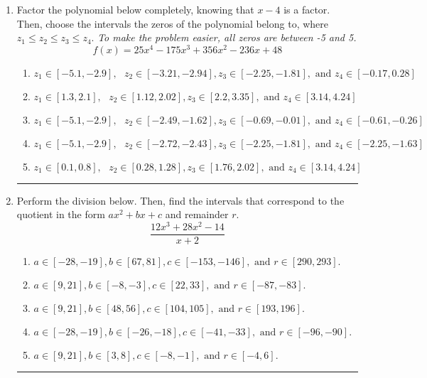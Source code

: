 \documentclass[14pt]{extbook}
\newcommand{\litem}[1]{\item#1\hspace*{-1cm}\rule{\textwidth}{0.4pt}}
\begin{document}
\begin{enumerate}
{\begin{enumerate}[label=\Alph*.]
\end{enumerate} }
\litem{
Factor the polynomial below completely, knowing that $x-4$ is a factor. Then, choose the intervals the zeros of the polynomial belong to, where $z_1 \leq z_2 \leq z_3 \leq z_4$. \textit{To make the problem easier, all zeros are between -5 and 5.}\[ f(x) = 25x^{4} -175 x^{3} +356 x^{2} -236 x + 48 \]\begin{enumerate}[label=\Alph*.]
\item \( z_1 \in [-5.1, -2.9], \text{   }  z_2 \in [-3.21, -2.94], z_3 \in [-2.25, -1.81], \text{   and   } z_4 \in [-0.17, 0.28] \)
\item \( z_1 \in [1.3, 2.1], \text{   }  z_2 \in [1.12, 2.02], z_3 \in [2.2, 3.35], \text{   and   } z_4 \in [3.14, 4.24] \)
\item \( z_1 \in [-5.1, -2.9], \text{   }  z_2 \in [-2.49, -1.62], z_3 \in [-0.69, -0.01], \text{   and   } z_4 \in [-0.61, -0.26] \)
\item \( z_1 \in [-5.1, -2.9], \text{   }  z_2 \in [-2.72, -2.43], z_3 \in [-2.25, -1.81], \text{   and   } z_4 \in [-2.25, -1.63] \)
\item \( z_1 \in [0.1, 0.8], \text{   }  z_2 \in [0.28, 1.28], z_3 \in [1.76, 2.02], \text{   and   } z_4 \in [3.14, 4.24] \)

\end{enumerate} }
\litem{
Perform the division below. Then, find the intervals that correspond to the quotient in the form $ax^2+bx+c$ and remainder $r$.\[ \frac{12x^{3} +28 x^{2} -14}{x + 2} \]\begin{enumerate}[label=\Alph*.]
\item \( a \in [-28, -19], b \in [67, 81], c \in [-153, -146], \text{ and } r \in [290, 293]. \)
\item \( a \in [9, 21], b \in [-8, -3], c \in [22, 33], \text{ and } r \in [-87, -83]. \)
\item \( a \in [9, 21], b \in [48, 56], c \in [104, 105], \text{ and } r \in [193, 196]. \)
\item \( a \in [-28, -19], b \in [-26, -18], c \in [-41, -33], \text{ and } r \in [-96, -90]. \)
\item \( a \in [9, 21], b \in [3, 8], c \in [-8, -1], \text{ and } r \in [-4, 6]. \)


\end{enumerate}}
\end{enumerate}
\end{document}
